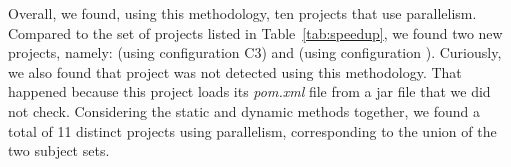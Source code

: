 Overall, we found, using this methodology, ten projects that use
parallelism.  Compared to the set of projects listed in
Table~\ref{tab:speedup}, we found two new projects, namely:
 (using
configuration C3) and  (using configuration
\ForkSeq{}).  Curiously, we also found that project  was
not detected using this methodology.  That happened because this
project loads its \emph{pom.xml} file from a jar file that we did not
check.  Considering the static and dynamic methods together, we found
a total of 11 distinct projects using parallelism, corresponding to
the union of the two subject sets.

\vspace{1ex}
\begin{center}
\end{center}
\vspace{1ex}



